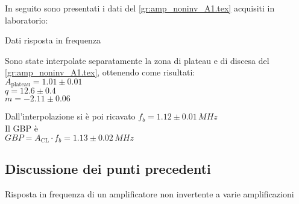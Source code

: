 In seguito sono presentati i dati del  \autoref{gr:amp_noninv_A1.tex} acquisiti in laboratorio:
\begin{tabella}
 \centering
  
 \caption{Dati risposta in frequenza}
 \label{tab:tab_noninv_A1.tex}
\end{tabella}
Sono state interpolate separatamente la zona di plateau e di discesa del  \autoref{gr:amp_noninv_A1.tex}, ottenendo come risultati:\\
$A_\textrm{plateau}=1.01 \pm 0.01$\\
$q = 12.6 \pm 0.4$\\
$m  = -2.11 \pm 0.06$

Dall'interpolazione si è poi ricavato 
$f_b=1.12\pm 0.01 \,MHz $\\
Il GBP è\\
$GBP=A_\textrm{CL} \cdot f_b  = 1.13 \pm 0.02 \,MHz$



\subsection{Discussione dei punti precedenti}

\begin{grafico}
 \centering 
  \resizebox{\textwidth}{!}{%
  
 }%
 \caption{Risposta in frequenza di un amplificatore non invertente a varie amplificazioni} 
 \label{gr:amp_noninv_all.tex} 
\end{grafico}


